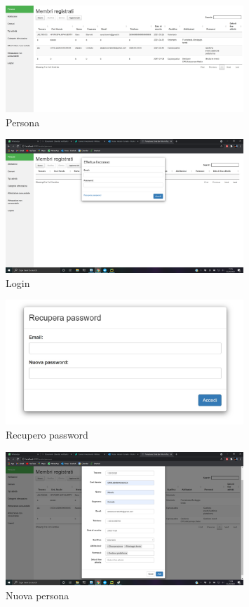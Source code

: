 \documentclass[11pt,a4paper,english]{article}
\begin{document}
\begin{figure}[H]
    \centering
    \includegraphics[width=0.8\textwidth]{img/persona.jpg}
    \caption{Persona}
\end{figure}

\begin{figure}[H]
    \centering
    \includegraphics[width=0.8\textwidth]{img/login.png}
    \caption{Login}
\end{figure}

\begin{figure}[H]
    \centering
    \includegraphics[width=0.8\textwidth]{img/recupero_screen.jpg}
    \caption{Recupero password}
\end{figure}

\begin{figure}[H]
    \centering
    \includegraphics[width=0.8\textwidth]{img/new.png}
    \caption{Nuova persona}
\end{figure}
\end{document}
